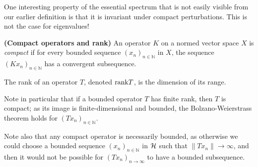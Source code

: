 \documentclass[../main.tex]{subfiles}
\begin{document}
One interesting property of the essential spectrum that is not easily visible
from our earlier definition is that it is invariant under compact perturbations.
This is not the case for eigenvalues!

\begin{definition}{\textbf{(Compact operators and rank)}}
  An operator $K$ on a normed vector space $X$ is \emph{compact} if for every
  bounded sequence $(x_n)_{n \in \mathbb{N}}$ in $X$, the sequence
  $(Kx_n)_{n \in \mathbb{N}}$ has a convergent subsequence.

  The rank of an operator $T$, denoted $\mathrm{rank} T$, is the dimension of its range.
\end{definition}

Note in particular that if a bounded operator $T$ has finite rank, then $T$ is
compact; as its image is finite-dimensional and bounded, the Bolzano-Weierstrass
theorem holds for $(Tx_n)_{n \in \mathbb{N}}$.

Note also that any compact operator is necessarily bounded, as otherwise we
could choose a bounded sequence $(x_n)_{n \in \mathbb{N}}$ in $\mathcal{H}$ such
that $\|Tx_n\| \rightarrow \infty$, and then it would not be possible for
$(Tx_n)_{n \rightarrow \infty}$ to have a bounded subsequence. 
\end{document}
